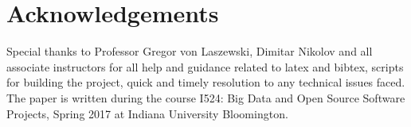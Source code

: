 \documentclass[9pt,twocolumn,twoside]{../../styles/osajnl}
\begin{document}
\section*{Acknowledgements}
Special thanks to Professor Gregor von Laszewski, Dimitar Nikolov and all
associate instructors for all help and guidance related to latex and bibtex,
scripts for building the project, quick and timely resolution to any technical
issues faced. The paper is written during the course  {I524: Big Data and Open
Source Software Projects, Spring 2017} at Indiana University Bloomington.

\medskip

% 

\end{document}
